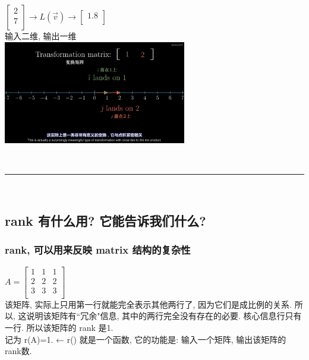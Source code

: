 \documentclass[UTF8]{ctexart}
\begin{document}
\begin{myEnvSample}
$\left[ \begin{array}{l}
	2\\
	7\\
\end{array} \right] \rightarrow L(\vec{v})\rightarrow \left[ \begin{matrix}
	1.8\\
\end{matrix} \right]$\\

输入二维, 输出一维\\
\includegraphics[width=0.6\textwidth]{img/0042.png}\\
\end{myEnvSample}


~\\
\hrule
~\\

\subsection{rank 有什么用? 它能告诉我们什么?}

\subsubsection{rank, 可以用来反映 matrix 结构的复杂性}

\begin{myEnvSample}
$A=\left[ \begin{matrix}
	1&		1&		1\\
	2&		2&		2\\
	3&		3&		3\\
\end{matrix} \right]$ \\

该矩阵, 实际上只用第一行就能完全表示其他两行了, 因为它们是成比例的关系. 所以, 这说明该矩阵有``冗余"信息, 其中的两行完全没有存在的必要. 核心信息行只有一行. 所以该矩阵的 rank 是1. \\
记为 r(A)=1. ← r() 就是一个函数, 它的功能是: 输入一个矩阵, 输出该矩阵的 rank数.
\end{myEnvSample}
\end{document}
